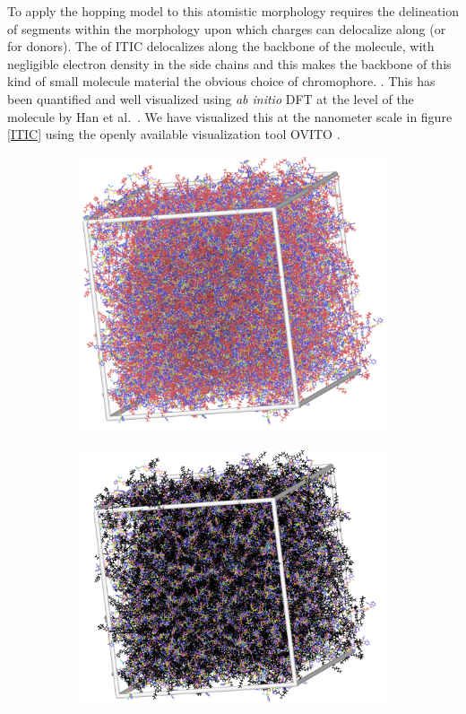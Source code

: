 To apply the hopping model to this atomistic morphology requires the
delineation of segments within the morphology upon which charges can delocalize along  (or 
 for donors).   
The  of ITIC delocalizes along the backbone of the molecule, with
negligible electron density in the side chains and this makes the backbone of this kind of small molecule
material the obvious choice of chromophore.
. This has been quantified and well visualized using \textit{ab
initio} DFT at the level of the molecule by Han et al.~\cite{Han2019}.
We have visualized this at the nanometer scale in figure \ref{ITIC} using the openly
available visualization tool OVITO \cite{Stukowski2010a}. 
\begin{figure}
\centering
\begin{subfigure}{.5\textwidth}
    \includegraphics[width=\textwidth]{figures/ITIC-blackedout-unwrapped-allatom.png}
\end{subfigure}%
\begin{subfigure}{.5\textwidth}
    \includegraphics[width=\textwidth]{figures/ITIC-blackedout-unwrapped.png}

\end{subfigure}
\end{figure}
